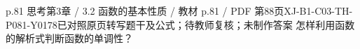 \par\noindent\begin{minipage}{\linewidth}
\begin{bankitem}{p.81 思考}{第3章 / 3.2 函数的基本性质 / 教材 p.81 / PDF 第88页}{XJ-B1-C03-TH-P081-Y0178}{已对照原页转写题干及公式；待教师复核；未制作答案}
怎样利用函数的解析式判断函数的单调性？
\end{bankitem}
\end{minipage}\par\medskip
